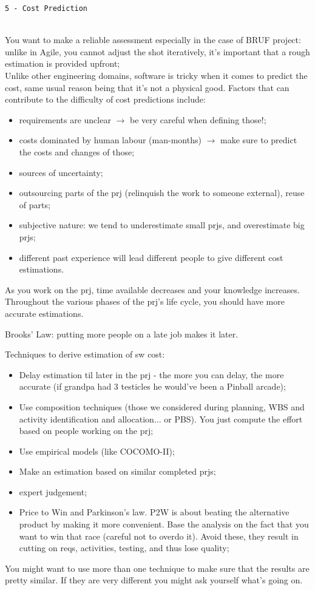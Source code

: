 
\begin{center}\texttt{5 - Cost Prediction}\end{center}
\hrulefill \\

\noindent You want to make a reliable assessment especially in the case of BRUF project: unlike in Agile, you cannot adjust the shot iteratively, it's important that a rough estimation is provided upfront;\\Unlike other engineering domains, software is tricky when it comes to predict the cost, same usual reason being that it's not a physical good. Factors that can contribute to the difficulty of cost predictions include:
\begin{itemize}
    \item requirements are unclear $\rightarrow$ be very careful when defining those!;
    \item costs dominated by human labour (man-months) $\rightarrow$ make sure to predict the costs and changes of those;
    \item sources of uncertainty;
    \item outsourcing parts of the prj (relinquish the work to someone external), reuse of parts;
    \item subjective nature: we tend to underestimate small prjs, and overestimate big prjs;
    \item different past experience will lead different people to give different cost estimations.
\end{itemize}

\noindent As you work on the prj, time available decreases and your knowledge increases. Throughout the various phases of the prj's life cycle, you should have more accurate estimations.

\noindent Brooks' Law: putting more people on a late job makes it later.

\noindent Techniques to derive estimation of sw cost:
\begin{itemize}
    \item Delay estimation til later in the prj - the more you can delay, the more accurate (if grandpa had 3 testicles he would've been a Pinball arcade);
    \item Use composition techniques (those we considered during planning, WBS and activity identification and allocation... or PBS). You just compute the effort based on people working on the prj;
    \item Use empirical models (like COCOMO-II);
    \item Make an estimation based on similar completed prjs;
    \item expert judgement;
    \item Price to Win and Parkinson's law. P2W is about beating the alternative product by making it more convenient. Base the analysis on the fact that you want to win that race (careful not to overdo it). Avoid these, they result in cutting on reqs, activities, testing, and thus lose quality;
\end{itemize}
\noindent You might want to use more than one technique to make sure that the results are pretty similar. If they are very different you might ask yourself what's going on.

